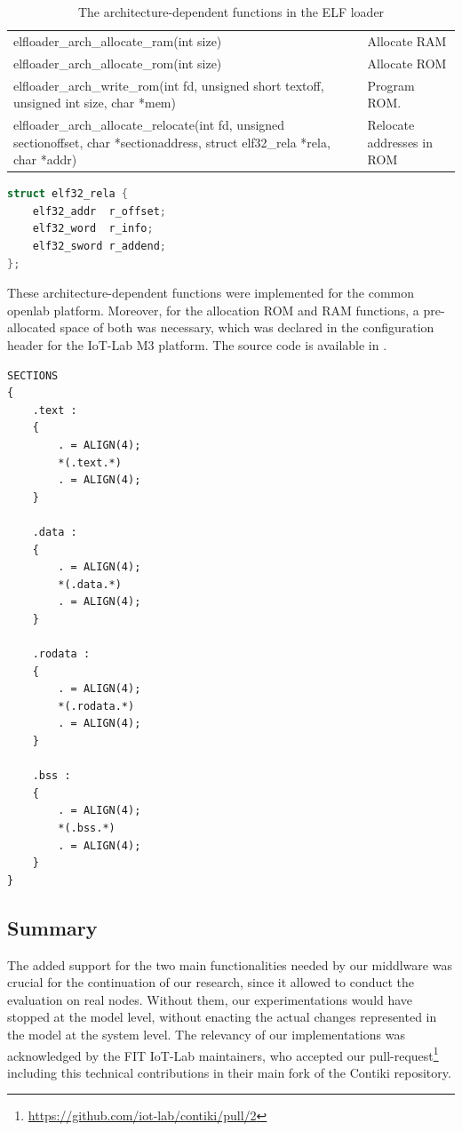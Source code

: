 \begin{table}[htb]
	\centering
	\scriptsize
	\caption{The architecture-dependent functions in the ELF loader}
	\label{tab:loaderFunc}
	\begin{tabular}{p{9cm}l}
		elfloader\_arch\_allocate\_ram(int size)                                                                                        & Allocate RAM              \\
		elfloader\_arch\_allocate\_rom(int size)                                                                                        & Allocate ROM              \\
		elfloader\_arch\_write\_rom(int fd, unsigned short textoff, unsigned int size, char *mem)                                       & Program ROM.              \\
		elfloader\_arch\_allocate\_relocate(int fd, unsigned sectionoffset, char *sectionaddress, struct elf32\_rela *rela, char *addr) & Relocate addresses in ROM
	\end{tabular}
\end{table}

\begin{lstlisting}[language=C, caption=The 32-bit ELF relocation structure, label=lst:ELFreloc]
struct elf32_rela {
	elf32_addr	r_offset;
	elf32_word	r_info;
	elf32_sword	r_addend;
};
\end{lstlisting}

These architecture-dependent functions were implemented for the common openlab platform.
Moreover, for the allocation ROM and RAM functions, a pre-allocated space of both was necessary, which was declared in the configuration header for the IoT-Lab M3 platform.
The source code is available in .

\begin{lstlisting}[caption=Script used to merge all sections into only the ones required by the Contiki ELF loader, label=lst:script4CELF]
SECTIONS
{
	.text :
	{
		. = ALIGN(4);
		*(.text.*)
		. = ALIGN(4);
	}
	
	.data :
	{
		. = ALIGN(4);
		*(.data.*)
		. = ALIGN(4);
	}
	
	.rodata :
	{
		. = ALIGN(4);
		*(.rodata.*)
		. = ALIGN(4);
	}
	
	.bss :
	{
		. = ALIGN(4);
		*(.bss.*)
		. = ALIGN(4);
	}
}
\end{lstlisting}

\subsection{Summary}
The added support for the two main functionalities needed by our middlware was crucial for the continuation of our research, since it allowed to conduct the evaluation on real nodes.
Without them, our experimentations would have stopped at the model level, without enacting the actual changes represented in the model at the system level.
The relevancy of our implementations was acknowledged by the FIT IoT-Lab maintainers, who accepted our pull-request\footnote{\url{https://github.com/iot-lab/contiki/pull/2}} including this technical contributions in their main fork of the Contiki repository.

